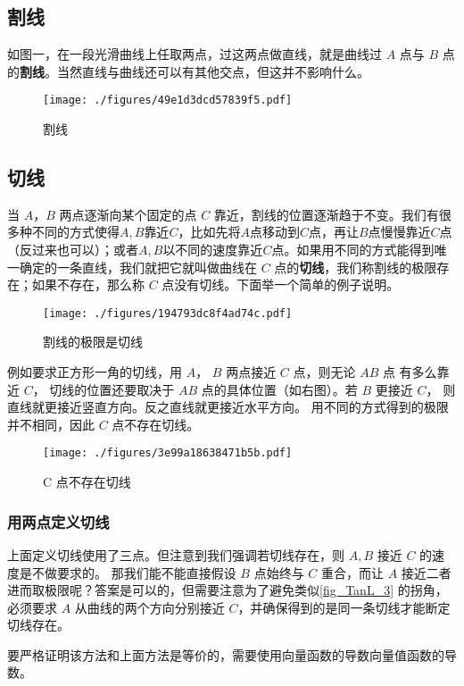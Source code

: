 


\subsection{割线}
如图一，在一段光滑曲线上任取两点，过这两点做直线，就是曲线过 $A$ 点与 $B$ 点的\textbf{割线}。当然直线与曲线还可以有其他交点，但这并不影响什么。
\begin{figure}[ht]
\centering
\texttt{[image: ./figures/49e1d3dcd57839f5.pdf]}
\caption{割线} \label{fig_TanL_1}
\end{figure}

\subsection{切线}
当 $A$，$B$ 两点逐渐向某个固定的点 $C$ 靠近，割线的位置逐渐趋于不变。我们有很多种不同的方式使得$A, B$靠近$C$，比如先将$A$点移动到$C$点，再让$B$点慢慢靠近$C$点（反过来也可以）；或者$A, B$以不同的速度靠近$C$点。如果用不同的方式能得到唯一确定的一条直线，我们就把它就叫做曲线在 $C$ 点的\textbf{切线}，我们称割线的极限存在；如果不存在，那么称 $C$ 点没有切线。下面举一个简单的例子说明。

\begin{figure}[ht]
\vskip 0pt
\centering
\texttt{[image: ./figures/194793dc8f4ad74c.pdf]}
\caption{割线的极限是切线} \label{fig_TanL_2}
\end{figure}
例如要求正方形一角的切线，用
 $A$，  $B$ 两点接近 $C$ 点，则无论 $AB$ 点
有多么靠近 $C$， 切线的位置还要取决于 $AB$ 点的具体位置（如右图）。若 $B$ 更接近 $C$， 则直线就更接近竖直方向。反之直线就更接近水平方向。 用不同的方式得到的极限并不相同，因此 $C$ 点不存在切线。

\begin{figure}[ht]
\centering
\texttt{[image: ./figures/3e99a18638471b5b.pdf]}
\caption{C 点不存在切线} \label{fig_TanL_3}
\end{figure}

\subsubsection{用两点定义切线}
上面定义切线使用了三点。但注意到我们强调若切线存在，则 $A,B$ 接近 $C$ 的速度是不做要求的。 那我们能不能直接假设 $B$ 点始终与 $C$ 重合，而让 $A$ 接近二者进而取极限呢？答案是可以的，但需要注意为了避免类似\autoref{fig_TanL_3} 的拐角，必须要求 $A$ 从曲线的两个方向分别接近 $C$，并确保得到的是同一条切线才能断定切线存在。

要严格证明该方法和上面方法是等价的，需要使用向量函数的导数向量值函数的导数。
